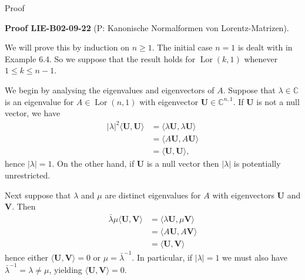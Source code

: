 \documentclass[10pt, letterpaper]{article}
\newcommand{\CustomHeading}[3]{%
  \par\medskip\noindent%
  \textbf{#1 #2} \textnormal{(#3)}.\enskip%
}
\newenvironment{PROOF}[2]{\begin{unitbox}\CustomHeading{Proof}{#1}{#2}}{\end{unitbox}}
\begin{document}
Proof


\begin{PROOF}{LIE-B02-09-22}{P: Kanonische Normalformen von Lorentz-Matrizen}
We will prove this by induction on $n \geqslant 1$. The initial case $n=1$ is dealt with in Example 6.4. So we suppose that the result holds for $\operatorname{Lor}(k, 1)$ whenever $1 \leqslant k \leqslant n-1$.

We begin by analysing the eigenvalues and eigenvectors of $A$. Suppose that $\lambda \in \mathbb{C}$ is an eigenvalue for $A \in \operatorname{Lor}(n, 1)$ with eigenvector $\mathbf{U} \in \mathbb{C}^{n, 1}$. If $\mathbf{U}$ is not a null vector, we have
$$
\begin{aligned}
|\lambda|^{2}\langle\mathbf{U}, \mathbf{U}\rangle & =\langle\lambda \mathbf{U}, \lambda \mathbf{U}\rangle \\
& =\langle A \mathbf{U}, A \mathbf{U}\rangle \\
& =\langle\mathbf{U}, \mathbf{U}\rangle,
\end{aligned}
$$
hence $|\lambda|=1$. On the other hand, if $\mathbf{U}$ is a null vector then $|\lambda|$ is potentially unrestricted.

Next suppose that $\lambda$ and $\mu$ are distinct eigenvalues for $A$ with eigenvectors $\mathbf{U}$ and $\mathbf{V}$. Then
$$
\begin{aligned}
\bar{\lambda} \mu\langle\mathbf{U}, \mathbf{V}\rangle & =\langle\lambda \mathbf{U}, \mu \mathbf{V}\rangle \\
& =\langle A \mathbf{U}, A \mathbf{V}\rangle \\
& =\langle\mathbf{U}, \mathbf{V}\rangle
\end{aligned}
$$
hence either $\langle\mathbf{U}, \mathbf{V}\rangle=0$ or $\mu=\bar{\lambda}^{-1}$. In particular, if $|\lambda|=1$ we must also have $\bar{\lambda}^{-1}=\lambda \neq \mu$, yielding $\langle\mathbf{U}, \mathbf{V}\rangle=0$.


\end{PROOF}
\end{document}
